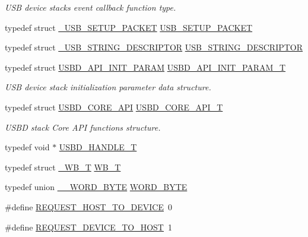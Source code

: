 \begin{DoxyCompactItemize}
\begin{DoxyCompactList}\small\item\em U\+SB device stack\textquotesingle{}s event callback function type. \end{DoxyCompactList}\item 
typedef struct \hyperlink{struct__USB__SETUP__PACKET}{\+\_\+\+U\+S\+B\+\_\+\+S\+E\+T\+U\+P\+\_\+\+P\+A\+C\+K\+ET} \hyperlink{group__USBD__Core_ga4a940f7627cc7e9f0bb693cc0fce8637}{U\+S\+B\+\_\+\+S\+E\+T\+U\+P\+\_\+\+P\+A\+C\+K\+ET}
\item 
typedef struct \hyperlink{struct__USB__STRING__DESCRIPTOR}{\+\_\+\+U\+S\+B\+\_\+\+S\+T\+R\+I\+N\+G\+\_\+\+D\+E\+S\+C\+R\+I\+P\+T\+OR} \hyperlink{group__USBD__Core_gabccfa24c1955b99a76219a89b8e6f3b6}{U\+S\+B\+\_\+\+S\+T\+R\+I\+N\+G\+\_\+\+D\+E\+S\+C\+R\+I\+P\+T\+OR}
\item 
typedef struct \hyperlink{structUSBD__API__INIT__PARAM}{U\+S\+B\+D\+\_\+\+A\+P\+I\+\_\+\+I\+N\+I\+T\+\_\+\+P\+A\+R\+AM} \hyperlink{group__USBD__Core_gaa6e8171941c1ae63afed95974e0f18e3}{U\+S\+B\+D\+\_\+\+A\+P\+I\+\_\+\+I\+N\+I\+T\+\_\+\+P\+A\+R\+A\+M\+\_\+T}
\begin{DoxyCompactList}\small\item\em U\+SB device stack initialization parameter data structure. \end{DoxyCompactList}\item 
typedef struct \hyperlink{structUSBD__CORE__API}{U\+S\+B\+D\+\_\+\+C\+O\+R\+E\+\_\+\+A\+PI} \hyperlink{group__USBD__Core_ga6a53e8395d1c68f98d18ca4a49b75baa}{U\+S\+B\+D\+\_\+\+C\+O\+R\+E\+\_\+\+A\+P\+I\+\_\+T}
\begin{DoxyCompactList}\small\item\em U\+S\+BD stack Core A\+PI functions structure. \end{DoxyCompactList}\item 
typedef void $\ast$ \hyperlink{group__USBD__Core_gafdbb2204d929cb9d75736bd2b42342ac}{U\+S\+B\+D\+\_\+\+H\+A\+N\+D\+L\+E\+\_\+T}
\item 
typedef struct \hyperlink{struct__WB__T}{\+\_\+\+W\+B\+\_\+T} \hyperlink{group__USBD__Core_ga4fbe30f5ac133f5bb15c653a19162ae9}{W\+B\+\_\+T}
\item 
typedef union \hyperlink{union____WORD__BYTE}{\+\_\+\+\_\+\+W\+O\+R\+D\+\_\+\+B\+Y\+TE} \hyperlink{group__USBD__Core_ga340ec8de2973608b96d5cc7379b9561a}{W\+O\+R\+D\+\_\+\+B\+Y\+TE}
\end{DoxyCompactItemize}
\begin{DoxyCompactItemize}
\item 
\#define \hyperlink{group__USBD__Core_ga8d90abb0515c0c9cd7c80480f1ebe7d3}{R\+E\+Q\+U\+E\+S\+T\+\_\+\+H\+O\+S\+T\+\_\+\+T\+O\+\_\+\+D\+E\+V\+I\+CE}~0
\item 
\#define \hyperlink{group__USBD__Core_gaf8f8eae5ae324d7d3e1344e97e23b20f}{R\+E\+Q\+U\+E\+S\+T\+\_\+\+D\+E\+V\+I\+C\+E\+\_\+\+T\+O\+\_\+\+H\+O\+ST}~1
\end{DoxyCompactItemize}

